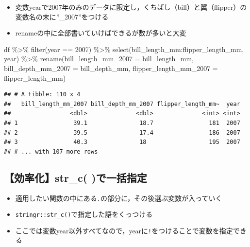 \documentclass[
  xelatex,ja=standard, b5paper]{bxjsbook}
\newenvironment{Shaded}{\begin{snugshade}}{\end{snugshade}}
\newcommand{\AttributeTok}[1]{\textcolor[rgb]{0.77,0.63,0.00}{#1}}
\newcommand{\DecValTok}[1]{\textcolor[rgb]{0.00,0.00,0.81}{#1}}
\newcommand{\FunctionTok}[1]{\textcolor[rgb]{0.00,0.00,0.00}{#1}}
\newcommand{\NormalTok}[1]{#1}
\newcommand{\SpecialCharTok}[1]{\textcolor[rgb]{0.00,0.00,0.00}{#1}}
\providecommand{\tightlist}{%
  \setlength{\itemsep}{0pt}\setlength{\parskip}{0pt}}
\begin{document}
\begin{itemize}
\tightlist
\item
  変数yearで2007年のみのデータに限定し，くちばし（bill）と翼（flipper）の変数名の末に''\_2007''をつける
\item
  renameの中に全部書いていけばできるが数が多いと大変
\end{itemize}

\begin{Shaded}
\begin{Highlighting}[]
\NormalTok{df }\SpecialCharTok{\%\textgreater{}\%} 
  \FunctionTok{filter}\NormalTok{(year }\SpecialCharTok{==} \DecValTok{2007}\NormalTok{) }\SpecialCharTok{\%\textgreater{}\%} 
  \FunctionTok{select}\NormalTok{(bill\_length\_mm}\SpecialCharTok{:}\NormalTok{flipper\_length\_mm, year) }\SpecialCharTok{\%\textgreater{}\%} 
  \FunctionTok{rename}\NormalTok{(}\AttributeTok{bill\_length\_mm\_2007 =}\NormalTok{ bill\_length\_mm,}
         \AttributeTok{bill\_depth\_mm\_2007  =}\NormalTok{ bill\_depth\_mm,}
         \AttributeTok{flipper\_length\_mm\_2007 =}\NormalTok{ flipper\_length\_mm)}
\end{Highlighting}
\end{Shaded}

\begin{verbatim}
## # A tibble: 110 x 4
##   bill_length_mm_2007 bill_depth_mm_2007 flipper_length_mm~  year
##                 <dbl>              <dbl>              <int> <int>
## 1                39.1               18.7                181  2007
## 2                39.5               17.4                186  2007
## 3                40.3               18                  195  2007
## # ... with 107 more rows
\end{verbatim}

\hypertarget{rename-strc}{%
\subsection{【効率化】str\_c( )で一括指定}\label{rename-strc}}

\begin{itemize}
\tightlist
\item
  適用したい関数の中にある\texttt{.}の部分に，その後選ぶ変数が入っていく
\item
  \texttt{stringr::str\_c()}で指定した語をくっつける
\item
  ここでは変数year以外すべてなので，yearに\texttt{!}をつけることで変数を指定できる
\end{itemize}
\end{document}
